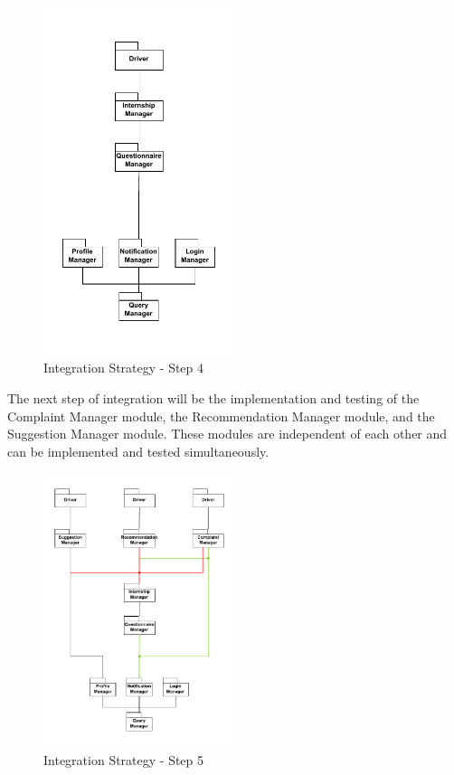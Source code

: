 \begin{figure}[H]
    \centering
    \includegraphics[width=0.5\textwidth]{Images/Integ_4.pdf}
    \caption{Integration Strategy - Step 4}
    \label{fig:integration-strategy-step-4}
\end{figure}

\par The next step of integration will be the implementation and testing of the Complaint Manager module, the Recommendation
Manager module, and the Suggestion Manager module. These modules are independent of each other and can be implemented and
tested simultaneously.

\begin{figure}[H]
    \centering
    \includegraphics[width=0.5\textwidth]{Images/Integ_5.pdf}
    \caption{Integration Strategy - Step 5}
    \label{fig:integration-strategy-step-5}
\end{figure}

